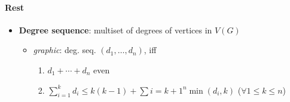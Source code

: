 \paragraph{Rest}
\begin{itemize}
  \item \textbf{Degree sequence}: multiset of degrees of vertices in $ V(G) $
  \begin{itemize}
    \item \emph{graphic}: deg. seq. $ (d_1, \dots, d_n) $, iff
    \begin{enumerate}
       \item $ d_1 + \cdots + d_n $ even
       \item $ \sum_{i=1}^k d_i \leq k(k-1) + \sum{i = k+1}^n \min(d_i,k) $ \quad ($ \forall 1 \leq k \leq n $)
     \end{enumerate} 
  \end{itemize}
\end{itemize}